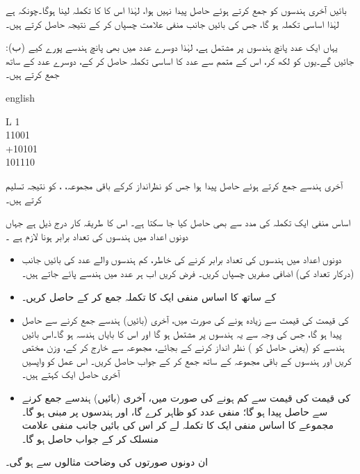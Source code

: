 بائیں آخری ہندسوں کو جمع کرتے ہوئے حاصل  پیدا نہیں ہوا، لہٰذا اس کا  کا تکملہ لینا ہوگا۔چونکہ  ہے لہٰذا اساسی تکملہ  ہو گا، جس کی بائیں جانب منفی علامت چسپاں کر کے نتیجہ  حاصل کرتے ہیں۔

:\quad (ب) یہاں ایک عدد پانچ ہندسوں پر مشتمل ہے، لہٰذا دوسرے عدد میں بھی پانچ ہندسے پورے کیے جائیں گے۔یوں  کو  لکھ کر، اس کے متمم 
  سے عدد کا اساسی تکملہ  حاصل کر کے، دوسرے عدد کے ساتھ جمع کرتے ہیں۔
 \begin{center}
\begin{otherlanguage*}{english}
\begin{LTR}
\begin{tabular}{L}
\phantom{1}1\\
\phantom{+}11001\\
+10101\\
\midrule
\phantom{\,\,}101110
\end{tabular}
\end{LTR}
\end{otherlanguage*}
\end{center}

آخری ہندسے جمع کرتے ہوئے حاصل  پیدا ہوا جس کو نظرانداز کرکے باقی مجموعہ،  ، کو نتیجہ تسلیم کرتے ہیں۔


اساس منفی ایک تکملہ کی مدد سے بھی  حاصل کیا جا سکتا ہے۔ اس کا طریقہ کار درج ذیل ہے جہاں دونوں اعداد میں ہندسوں کی تعداد برابر ہونا لازم ہے ۔
\begin{itemize}
 \item
 دونوں اعداد میں ہندسوں کی تعداد برابر کرنے کی خاطر، کم ہندسوں والے عدد کی بائیں جانب (درکار تعداد کی) اضافی صفریں چسپاں کریں۔ فرض کریں اب ہر عدد میں  ہندسے پائے جاتے ہیں۔ 
 \item
  کے ساتھ  کا اساس منفی ایک کا تکملہ جمع کر کے   حاصل کریں۔
 \item
  کی قیمت  کی قیمت سے زیادہ ہونے کی صورت میں، آخری (بائیں) ہندسے جمع کرنے سے حاصل  پیدا ہو گا، جس کی وجہ سے یہ   ہندسوں پر مشتمل ہو گا اور اس کا بایاں ہندسہ  ہو گا۔اس بائیں ہندسے کو (یعنی حاصل  کو ) نظر انداز کرنے کے بجائے، مجموعہ سے خارج کر کے،  وزن مختص کریں اور  ہندسوں کے باقی مجموعہ کے ساتھ جمع کر کے جواب حاصل کریں۔ اس عمل کو واپسیں آخری حاصل ایک  کہتے ہیں۔
 \item
{}کی قیمت  کی قیمت سے کم ہونے کی صورت میں، آخری (بائیں) ہندسے جمع کرنے سے حاصل  پیدا  ہو گا؛  منفی عدد کو ظاہر کرے گا، اور  ہندسوں پر مبنی ہو گا۔مجموعے کا اساس منفی ایک کا تکملہ لے کر اس کی بائیں جانب منفی علامت منسلک کر کے جواب حاصل ہو گا۔
\end{itemize}
ان دونوں صورتوں کی وضاحت مثالوں سے ہو گی۔ 

